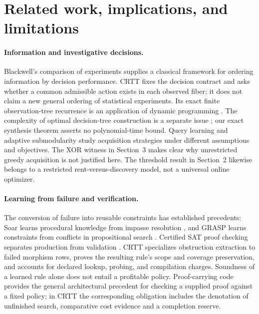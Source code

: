 \section{Related work, implications, and limitations}\label{sec:related}
\paragraph{Information and investigative decisions.}
Blackwell's comparison of experiments \cite{blackwell1953} supplies a classical framework for ordering information by decision performance. CRTT fixes the decision contract and asks whether a common admissible action exists in each observed fiber; it does not claim a new general ordering of statistical experiments. Its exact finite observation-tree recurrence is an application of dynamic programming \cite{bellman1957}. The complexity of optimal decision-tree construction is a separate issue \cite{hyafil1976}; our exact synthesis theorem asserts no polynomial-time bound. Query learning \cite{angluin1988} and adaptive submodularity \cite{golovin2011} study acquisition strategies under different assumptions and objectives. The XOR witness in Section~3 makes clear why unrestricted greedy acquisition is not justified here. The threshold result in Section~2 likewise belongs to a restricted rent-versus-discovery model, not a universal online optimizer.

\paragraph{Learning from failure and verification.}
The conversion of failure into reusable constraints has established precedents: Soar learns procedural knowledge from impasse resolution \cite{soar1987}, and GRASP learns constraints from conflicts in propositional search \cite{grasp1999}. Certified SAT proof checking separates production from validation \cite{lrat2017}. CRTT specializes obstruction extraction to failed morphism rows, proves the resulting rule's scope and coverage preservation, and accounts for declared lookup, probing, and compilation charges. Soundness of a learned rule alone does not entail a profitable policy. Proof-carrying code \cite{necula1997} provides the general architectural precedent for checking a supplied proof against a fixed policy; in CRTT the corresponding obligation includes the denotation of unfinished search, comparative cost evidence and a completion reserve.

